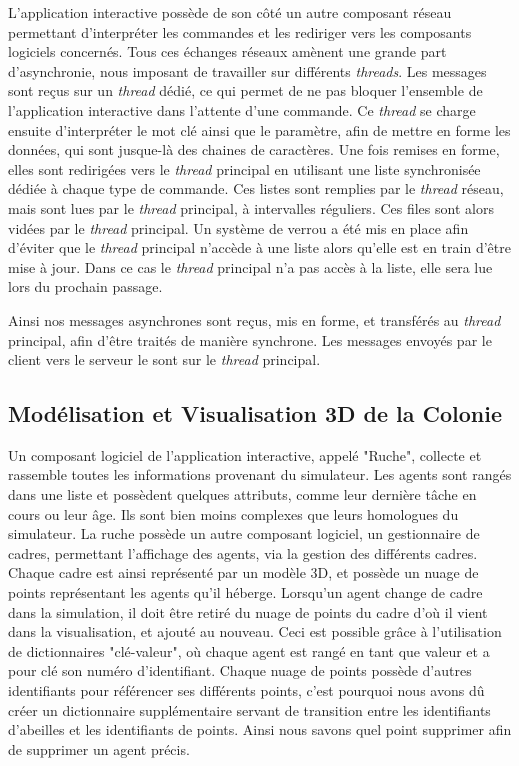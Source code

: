 	L'application interactive possède de son côté un autre composant réseau permettant d'interpréter les commandes et les rediriger vers les composants logiciels concernés. Tous ces échanges réseaux amènent une grande part d'asynchronie, nous imposant de travailler sur différents \textit{threads}. Les messages sont reçus sur un \textit{thread} dédié, ce qui permet de ne pas bloquer l'ensemble de l'application interactive dans l'attente d'une commande. Ce \textit{thread} se charge ensuite d'interpréter le mot clé ainsi que le paramètre, afin de mettre en forme les données, qui sont jusque-là des chaines de caractères. Une fois remises en forme, elles sont redirigées vers le \textit{thread} principal en utilisant une liste synchronisée dédiée à chaque type de commande. Ces listes sont remplies par le \textit{thread} réseau, mais sont lues par le \textit{thread} principal, à intervalles réguliers. Ces files sont alors vidées par le \textit{thread} principal. Un système de verrou a été mis en place afin d'éviter que le \textit{thread} principal n'accède à une liste alors qu'elle est en train d'être mise à jour. Dans ce cas le \textit{thread} principal n'a pas accès à la liste, elle sera lue lors du prochain passage.
	
	Ainsi nos messages asynchrones sont reçus, mis en forme, et transférés au \textit{thread} principal, afin d'être traités de manière synchrone. Les messages envoyés par le client vers le serveur le sont sur le \textit{thread} principal.
	
	\subsection{Modélisation et Visualisation 3D de la Colonie}		
	
	
		Un composant logiciel de l'application interactive, appelé "Ruche", collecte et rassemble toutes les informations provenant du simulateur. Les agents sont rangés dans une liste et possèdent quelques attributs, comme leur dernière tâche en cours ou leur âge. Ils sont bien moins complexes que leurs homologues du simulateur. La ruche possède un autre composant logiciel, un gestionnaire de cadres, permettant l'affichage des agents, via la gestion des différents cadres. Chaque cadre est ainsi représenté par un modèle 3D, et possède un nuage de points représentant les agents qu'il héberge. Lorsqu'un agent change de cadre dans la simulation, il doit être retiré du nuage de points du cadre d'où il vient dans la visualisation, et ajouté au nouveau. Ceci est possible grâce à l'utilisation de dictionnaires "clé-valeur", où chaque agent est rangé en tant que valeur et a pour clé son numéro d'identifiant. 
		Chaque nuage de points possède d'autres identifiants pour référencer ses différents points, c'est pourquoi nous avons dû créer un dictionnaire supplémentaire servant de transition entre les identifiants d'abeilles et les identifiants de points. Ainsi nous savons quel point supprimer afin de supprimer un agent précis.
		
